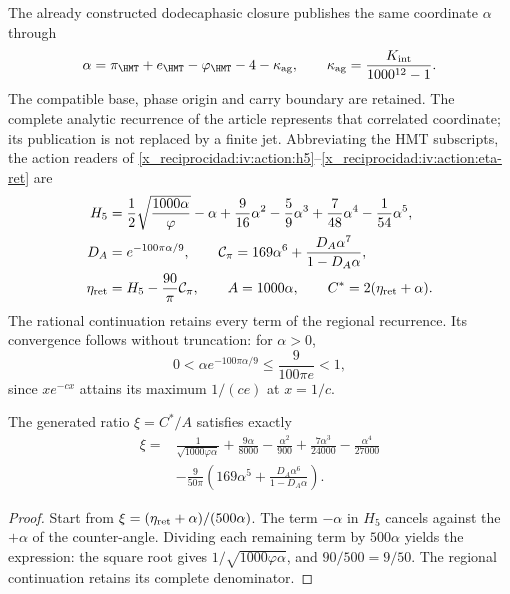 The already constructed dodecaphasic closure publishes the same coordinate \(\alpha\) through
\[
 \alpha=\pi_{\HMT}+e_{\HMT}-\varphi_{\HMT}-4-\kappa_{\rm ag},
 \qquad \kappa_{\rm ag}=\frac{K_{\rm int}}{1000^{12}-1}.
\]
The compatible base, phase origin and carry boundary are retained. The complete analytic recurrence of the article represents that correlated coordinate; its publication is not replaced by a finite jet. Abbreviating the HMT subscripts, the action readers of \eqref{x_reciprocidad:iv:action:h5}--\eqref{x_reciprocidad:iv:action:eta-ret} are
\begin{align}
 H_5&=\frac12\sqrt{\frac{1000\alpha}{\varphi}}-\alpha
       +\frac9{16}\alpha^2-\frac59\alpha^3
       +\frac7{48}\alpha^4-\frac1{54}\alpha^5,\nonumber\\
 D_A&=e^{-100\pi\alpha/9},\qquad
 \mathcal C_\pi=169\alpha^6+\frac{D_A\alpha^7}{1-D_A\alpha},\nonumber\\
 \eta_{\rm ret}&=H_5-\frac{90}{\pi}\mathcal C_\pi,
 \qquad A=1000\alpha,\qquad C^*=2(\eta_{\rm ret}+\alpha).
 \label{x_reciprocidad:rec:eq:lectores-completos}
\end{align}
The rational continuation retains every term of the regional recurrence. Its convergence follows without truncation: for \(\alpha>0\),
\[
 0<\alpha e^{-100\pi\alpha/9}\le\frac9{100\pi e}<1,
\]
since \(xe^{-cx}\) attains its maximum \(1/(ce)\) at \(x=1/c\).

\begin{proposition}
\label{x_reciprocidad:rec:prop:sustitucion}
The generated ratio \(\xi=C^*/A\) satisfies exactly
\begin{align}
 \xi={}&\frac1{\sqrt{1000\varphi\alpha}}
 +\frac{9\alpha}{8000}-\frac{\alpha^2}{900}
 +\frac{7\alpha^3}{24000}-\frac{\alpha^4}{27000}\nonumber\\
 &-\frac9{50\pi}
 \left(169\alpha^5+\frac{D_A\alpha^6}{1-D_A\alpha}\right).
 \label{x_reciprocidad:rec:eq:xi-completa}
\end{align}
\end{proposition}
\begin{proof}
Start from \(\xi=(\eta_{\rm ret}+\alpha)/(500\alpha)\). The term \(-\alpha\) in \(H_5\) cancels against the \(+\alpha\) of the counter-angle. Dividing each remaining term by \(500\alpha\) yields the expression: the square root gives \(1/\sqrt{1000\varphi\alpha}\), and \(90/500=9/50\). The regional continuation retains its complete denominator.
\end{proof}

